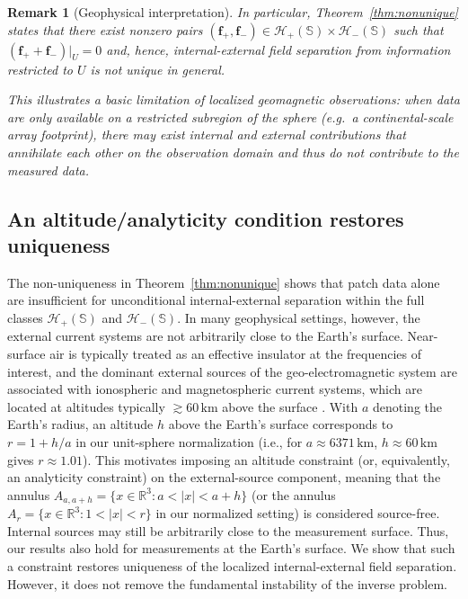 \documentclass[a4paper, 11pt]{article}
\newtheorem{remark}[theorem]{Remark}
\renewcommand{\SS}{\mathbb{S}}
\newcommand{\R}{\mathbb{R}}
\newcommand{\f}{\mathbf{f}}
\begin{document}
\begin{remark}[Geophysical interpretation]\label{rem:geo-nonunique}
In particular, Theorem~\ref{thm:nonunique} states that there exist nonzero pairs $(\f_+,\f_-)\in \mathcal H_+(\SS)\times \mathcal H_-(\SS)$ such that $(\f_+ + \f_-)|_U = 0$ and, hence, internal-external field separation from information restricted to $U$ is \emph{not} unique in general.
	
This illustrates a basic limitation of localized geomagnetic observations: when data are only available on a restricted subregion of the sphere (e.g.\ a continental-scale array footprint), there may exist internal and external contributions that annihilate each other on the observation domain and thus do not contribute to the measured data. 
\end{remark}

\subsection{An altitude/analyticity condition restores uniqueness
}\label{subsec:localized-conditioned}



The non-uniqueness in Theorem~\ref{thm:nonunique} shows that patch data alone are insufficient for unconditional internal-external separation within the full classes $\mathcal H_+(\SS)$ and $\mathcal H_-(\SS)$. In many geophysical settings, however, the external current systems are not arbitrarily close to the Earth's surface. Near-surface air is typically treated as an effective insulator at the frequencies of interest, and the dominant external sources of the geo-electromagnetic system are associated with ionospheric and magnetospheric current systems, which are located at altitudes typically $\gtrsim 60\,\mathrm{km}$ above the surface \cite{Campbell2003}. With $a$ denoting the Earth's radius, an altitude $h$ above the Earth's surface corresponds to $r=1+h/a$ in our unit-sphere normalization (i.e., for  $a\approx 6371\,\mathrm{km}$, $h\approx60\,\mathrm{km}$ gives $r\approx 1.01$). This motivates imposing an altitude constraint (or, equivalently, an analyticity constraint) on the external-source component, meaning that the annulus $A_{a,a+h}=\{x\in\R^3:a<|x|<a+h\}$ (or the annulus $A_r=\{x\in\R^3: 1<|x|<r\}$ in our normalized setting) is considered source-free. Internal sources may still be arbitrarily close to the measurement surface. Thus, our results also hold for measurements at the Earth's surface. We show that such a constraint restores uniqueness of the localized internal-external field separation. However, it does not remove the fundamental instability of the inverse problem.
\end{document}
